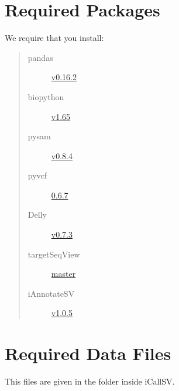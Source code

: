 \documentclass[letterpaper,10pt,english]{sphinxmanual}
\begin{document}
\section{Required Packages}
\label{iCallSV:required-packages}
We require that you install:
\begin{quote}\begin{description}
\item[{pandas}] \leavevmode
\href{http://pandas.pydata.org/}{v0.16.2}

\item[{biopython}] \leavevmode
\href{http://biopython.org/wiki/Main\_Page}{v1.65}

\item[{pysam}] \leavevmode
\href{https://pypi.python.org/pypi/pysam}{v0.8.4}

\item[{pyvcf}] \leavevmode
\href{https://pypi.python.org/pypi/PyVCF}{0.6.7}

\item[{Delly}] \leavevmode
\href{https://github.com/tobiasrausch/delly}{v0.7.3}

\item[{targetSeqView}] \leavevmode
\href{https://github.com/Eitan177/targetSeqView}{master}

\item[{iAnnotateSV}] \leavevmode
\href{https://github.com/rhshah/iAnnotateSV/tree/1.0.5}{v1.0.5}

\end{description}\end{quote}


\section{Required Data Files}
\label{iCallSV:required-data-files}
This files are given in the  folder inside iCallSV.
\end{document}
